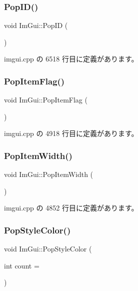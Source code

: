 \subsubsection{\texorpdfstring{Pop\+I\+D()}{PopID()}}
{\footnotesize\ttfamily void Im\+Gui\+::\+Pop\+ID (\begin{DoxyParamCaption}{ }\end{DoxyParamCaption})}



 imgui.\+cpp の 6518 行目に定義があります。

\mbox{\label{namespace_im_gui_aa93281155e1dd23715dbd384e91edc6b}} 
\subsubsection{\texorpdfstring{Pop\+Item\+Flag()}{PopItemFlag()}}
{\footnotesize\ttfamily void Im\+Gui\+::\+Pop\+Item\+Flag (\begin{DoxyParamCaption}{ }\end{DoxyParamCaption})}



 imgui.\+cpp の 4918 行目に定義があります。

\mbox{\label{namespace_im_gui_ad29a3fc0cb5dfc7f9fc7224512ce90bf}} 
\subsubsection{\texorpdfstring{Pop\+Item\+Width()}{PopItemWidth()}}
{\footnotesize\ttfamily void Im\+Gui\+::\+Pop\+Item\+Width (\begin{DoxyParamCaption}{ }\end{DoxyParamCaption})}



 imgui.\+cpp の 4852 行目に定義があります。

\mbox{\label{namespace_im_gui_a9795f730b4043a98b6254738d86efcdc}} 
\subsubsection{\texorpdfstring{Pop\+Style\+Color()}{PopStyleColor()}}
{\footnotesize\ttfamily void Im\+Gui\+::\+Pop\+Style\+Color (\begin{DoxyParamCaption}\item[{int}]{count = {} }\end{DoxyParamCaption})}



